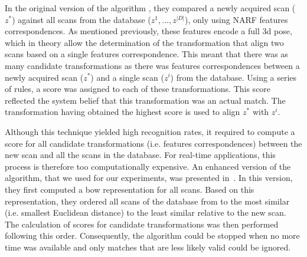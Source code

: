 In the original version of the algorithm \citep{Steder2010}, they compared a newly acquired scan ($z^*$) against all scans from the database ($z^1,...,z^{|D|}$), only using NARF features correspondences. As mentioned previously, these features encode a full \gls*{3d} pose, which in theory allow the determination of the transformation that align two scans based on a single features correspondence. This meant that there was as many candidate transformations as there was features correspondences between a newly acquired scan ($z^*$) and a single scan ($z^i$) from the database. Using a series of rules, a score was assigned to each of these transformations. This score reflected the system belief that this transformation was an actual match. The transformation having obtained the highest score is used to align $z^*$ with $z^i$.

Although this technique yielded high recognition rates, it required to compute a score for all candidate transformations (i.e. features correspondences) between the new scan and all the scans in the database. For real-time applications, this process is therefore too computationally expensive. An enhanced version of the algorithm, that we used for our experiments, was presented in~\cite{Steder2011b}. In this version, they first computed a \gls*{bow} representation for all scans. Based on this representation, they ordered all scans of the database from to the most similar (i.e. smallest Euclidean distance) to the least similar relative to the new scan. The calculation of scores for candidate transformations was then performed following this order. Consequently, the algorithm could be stopped when no more time was available and only matches that are less likely valid could be ignored. 


